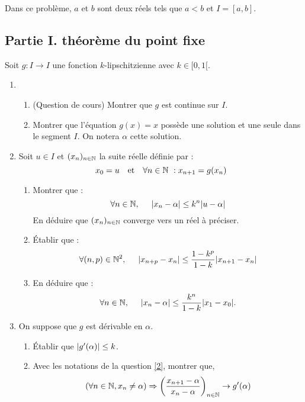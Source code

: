 
Dans ce problème, $a$ et $b$ sont deux réels tels que $a<b$ et $I=[a,b]$.

\subsection*{Partie I. théorème du point fixe}
Soit $g:I\to I$ une fonction $k$-lipschitzienne avec $k\in[0,1[$.

\begin{enumerate}
  \item 
  \begin{enumerate}
    \item (Question de cours) Montrer que $g$ est continue sur $I$.
    \item Montrer que l'équation $g(x)=x$ possède une solution et une seule dans le segment $I$. On notera $\alpha$ cette solution.
  \end{enumerate}
  
  \item  \label{2}Soit $u\in I$ et $(x_n)_{n\in\mathbb{N}}$ la suite réelle définie par  :
\begin{displaymath}
x_0=u\quad\text{et}\quad \forall n\in\mathbb{N}\ : x_{n+1}=g(x_n)  
\end{displaymath}
  \begin{enumerate}
    \item Montrer que :
\begin{displaymath}
  \forall n\in \mathbb{N},\hspace{0.5cm} |x_n-\alpha|\leq k^n|u-\alpha|
\end{displaymath}
En déduire que $(x_n)_{n\in \mathbb{N}}$ converge vers un réel à préciser.
    \item \'Etablir que :
    \begin{displaymath}
\forall(n,p)\in\mathbb{N}^2,\hspace{0.5cm}|x_{n+p}-x_n|\leq\frac{1-k^p}{1-k}|x_{n+1}-x_n|
\end{displaymath}
    \item En déduire que :
\begin{displaymath}
\forall n\in\mathbb{N}, \hspace{0.5cm} |x_{n}-\alpha|\leq\frac{k^n}{1-k}|x_1-x_0|.
\end{displaymath}
  \end{enumerate}
  \item On suppose que $g$ est dérivable en $\alpha$.
  \begin{enumerate}
  \item \'Etablir que $|g'(\alpha)|\leq k$.
   \item Avec les notations de la question \ref{2}, montrer que,
\begin{displaymath}
\left( \forall n\in\mathbb{N}, x_n\neq\alpha \right)
\Rightarrow
\left( \frac{x_{n+1}-\alpha}{x_n-\alpha}\right)_{n\in \mathbb{N}} \rightarrow g'(\alpha)
\end{displaymath}
    \end{enumerate}
\end{enumerate}

